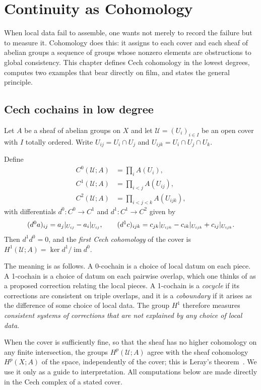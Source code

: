 \chapter{Continuity as Cohomology}
\label{ch:cohomology}

When local data fail to assemble, one wants not merely to record the failure but to measure it. Cohomology does this: it assigns to each cover and each sheaf of abelian groups a sequence of groups whose nonzero elements are obstructions to global consistency. This chapter defines Cech cohomology in the lowest degrees, computes two examples that bear directly on film, and states the general principle.

\section{Cech cochains in low degree}

Let $A$ be a sheaf of abelian groups on $X$ and let $\mathcal{U}=(U_i)_{i\in I}$ be an open cover with $I$ totally ordered. Write $U_{ij}=U_i\cap U_j$ and $U_{ijk}=U_i\cap U_j\cap U_k$.

\begin{definition}
Define
\begin{align*}
C^0(\mathcal{U};A)&=\prod_iA(U_i),\\
C^1(\mathcal{U};A)&=\prod_{i<j}A(U_{ij}),\\
C^2(\mathcal{U};A)&=\prod_{i<j<k}A(U_{ijk}),
\end{align*}
with differentials $d^0:C^0\to C^1$ and $d^1:C^1\to C^2$ given by
\[
(d^0a)_{ij}=a_j|_{U_{ij}}-a_i|_{U_{ij}},\qquad
(d^1c)_{ijk}=c_{jk}|_{U_{ijk}}-c_{ik}|_{U_{ijk}}+c_{ij}|_{U_{ijk}}.
\]
Then $d^1d^0=0$, and the \emph{first Cech cohomology} of the cover is $H^1(\mathcal{U};A)=\ker d^1/\operatorname{im}d^0$.
\end{definition}

The meaning is as follows. A 0-cochain is a choice of local datum on each piece. A 1-cochain is a choice of datum on each pairwise overlap, which one thinks of as a proposed correction relating the local pieces. A 1-cochain is a \emph{cocycle} if its corrections are consistent on triple overlaps, and it is a \emph{coboundary} if it arises as the difference of some choice of local data. The group $H^1$ therefore measures \emph{consistent systems of corrections that are not explained by any choice of local data}.

When the cover is sufficiently fine, so that the sheaf has no higher cohomology on any finite intersection, the groups $H^p(\mathcal{U};A)$ agree with the sheaf cohomology $H^p(X;A)$ of the space, independently of the cover; this is Leray's theorem~\cite{bott1982}. We use it only as a guide to interpretation. All computations below are made directly in the Cech complex of a stated cover.

